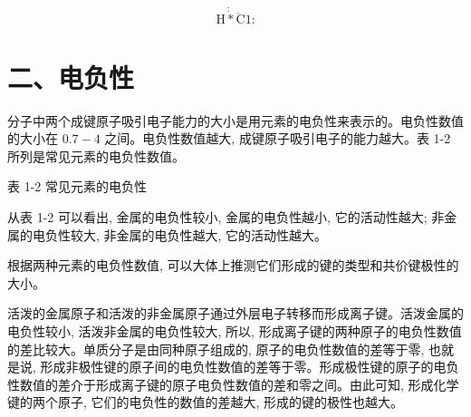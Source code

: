 \documentclass[10pt]{article}
\begin{document}
\[
\mathrm{H}\dot{\dot{ * }}\ddot{\mathrm{C}}\text{1:}
\]

\section*{二、电负性}

分子中两个成键原子吸引电子能力的大小是用元素的电负性来表示的。电负性数值的大小在 \({0.7} - 4\) 之间。电负性数值越大, 成键原子吸引电子的能力越大。表 1-2 所列是常见元素的电负性数值。

表 1-2 常见元素的电负性

\begin{center}
\end{center}

从表 1-2 可以看出, 金属的电负性较小, 金属的电负性越小, 它的活动性越大; 非金属的电负性较大, 非金属的电负性越大, 它的活动性越大。

根据两种元素的电负性数值, 可以大体上推测它们形成的键的类型和共价键极性的大小。

活泼的金属原子和活泼的非金属原子通过外层电子转移而形成离子键。活泼金属的电负性较小, 活泼非金属的电负性较大, 所以, 形成离子键的两种原子的电负性数值的差比较大。单质分子是由同种原子组成的, 原子的电负性数值的差等于零, 也就是说, 形成非极性键的原子间的电负性数值的差等于零。形成极性键的原子的电负性数值的差介于形成离子键的原子电负性数值的差和零之间。由此可知, 形成化学键的两个原子, 它们的电负性的数值的差越大, 形成的键的极性也越大。
\end{document}
